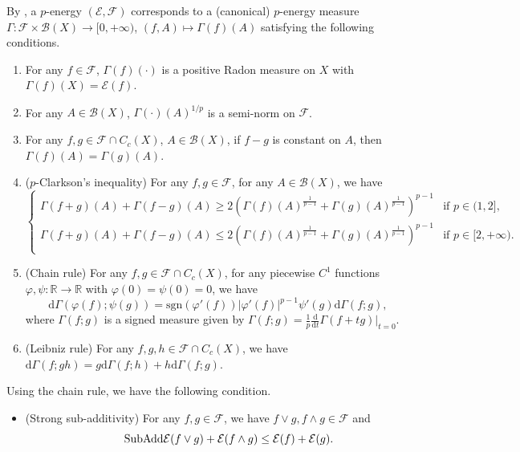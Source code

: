 \documentclass[11pt,a4paper]{article}
\numberwithin{equation}{section}
\theoremstyle{plain}
\theoremstyle{definition}
\begin{document}
By \cite[Theorem 2.4]{Sas26}, a $p$-energy $(\mathcal{E},\mathcal{F})$ corresponds to a (canonical) $p$-energy measure $\Gamma:\mathcal{F}\times\mathcal{B}(X)\to[0,+\infty)$, $(f,A)\mapsto\Gamma(f)(A)$ satisfying the following conditions.
\begin{enumerate}[label=(\alph*),ref=(\alph*)]
\item\label{item_meas1} For any $f\in\mathcal{F}$, $\Gamma(f)(\cdot)$ is a positive Radon measure on $X$ with $\Gamma(f)(X)=\mathcal{E}(f)$.
\item\label{item_meas2} For any $A\in\mathcal{B}(X)$, $\Gamma(\cdot)(A)^{1/p}$ is a semi-norm on $\mathcal{F}$.
\item\label{item_meas3} For any $f,g\in\mathcal{F}\cap C_c(X)$, $A\in\mathcal{B}(X)$, if $f-g$ is constant on $A$, then $\Gamma(f)(A)=\Gamma(g)(A)$.
\item\label{item_meas4} ($p$-Clarkson's inequality) For any $f,g\in\mathcal{F}$, for any $A\in\mathcal{B}(X)$, we have
\begin{equation*}
\begin{cases}
\Gamma(f+g)(A)+\Gamma(f-g)(A)\ge2 \left(\Gamma(f)(A)^{\frac{1}{p-1}}+\Gamma(g)(A)^{\frac{1}{p-1}}\right)^{p-1}&\text{if }p\in(1,2],\\
\Gamma(f+g)(A)+\Gamma(f-g)(A)\le2 \left(\Gamma(f)(A)^{\frac{1}{p-1}}+\Gamma(g)(A)^{\frac{1}{p-1}}\right)^{p-1}&\text{if }p\in[2,+\infty).\\
\end{cases}
\end{equation*}
\item\label{item_meas5} (Chain rule) For any $f,g\in\mathcal{F}\cap C_c(X)$, for any piecewise $C^1$ functions $\varphi,\psi:\mathbb{R}\to\mathbb{R}$ with $\varphi(0)=\psi(0)=0$, we have
$$\mathrm{d}\Gamma\left(\varphi(f);\psi(g)\right)=\mathrm{sgn}(\varphi'(f))|\varphi'(f)|^{p-1}\psi'(g)\mathrm{d}\Gamma(f;g),$$
where $\Gamma(f;g)$ is a signed measure given by $\Gamma(f;g)=\frac{1}{p}\frac{\mathrm{d}}{\mathrm{d}t}\Gamma(f+tg)|_{t=0}$.
\item\label{item_meas6} (Leibniz rule) For any $f,g,h\in \mathcal{F}\cap C_c(X)$, we have $\mathrm{d}\Gamma(f;gh)=g \mathrm{d}\Gamma(f;h)+h \mathrm{d}\Gamma(f;g)$.
\end{enumerate}
Using the chain rule, we have the following condition.
\begin{itemize}
\item (Strong sub-additivity) For any $f,g\in\mathcal{F}$, we have $f\vee g, f\wedge g\in\mathcal{F}$ and
\begin{equation*}\label{eq_SubAdd}\tag*{$\text{SubAdd}$}
\mathcal{E}(f\vee g)+\mathcal{E}(f\wedge g)\le\mathcal{E}(f)+\mathcal{E}(g).
\end{equation*}
\end{itemize}
\end{document}

